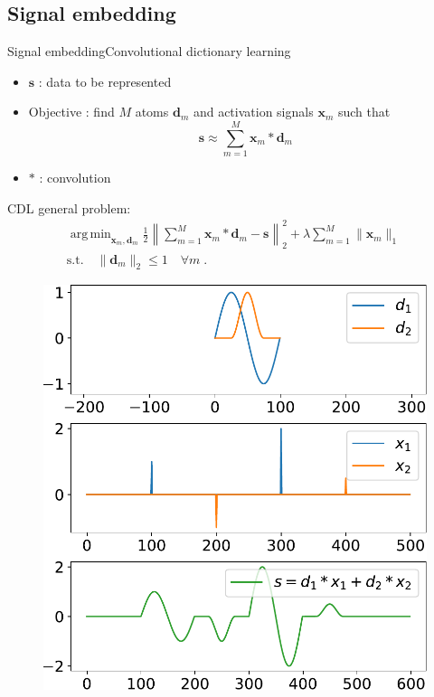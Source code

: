 \documentclass[8pt,t,aspectratio=1610]{beamer}
\newcommand{\bfx}{\mathbf{x}}
\newcommand{\bfs}{\mathbf{s}}
\newcommand{\bfd}{\mathbf{d}}
\DeclareMathOperator*{\argmin}{arg\,min}
\begin{document}
\subsection{Signal embedding}



\begin{frame}{Signal embedding}{Convolutional dictionary learning}
\begin{minipage}[t]{0.45\linewidth}
    \begin{itemize}
        \item $\bfs$ : data to be represented
        \item Objective : find $M$ atoms $\bfd_m$ and activation signals $\bfx_m$ such that
        $$\bfs \approx \sum_{m=1}^{M}\bfx_m * \bfd_m$$
        \item $*$ : convolution
    \end{itemize}
    \pause[3]
    CDL general problem:
    \begin{gather*}\label{eq:cdl_baseform}
    \argmin_{\bfx_m,\bfd_m} \frac{1}{2} \left\| \sum_{m=1}^{M} \bfx_{m} * \bfd_m - \bfs \right\|_2^2 + \lambda \sum_{m=1}^{M} \|\bfx_m \|_1 \ \\
        \text{s.t.}\quad \| \bfd_m\|_2 \leq 1 \quad \forall m \;. \nonumber
    \end{gather*}
\end{minipage}\hfill
\begin{minipage}[t]{0.4\linewidth}
    \centering
    \pause[2]
    \begin{figure}[h]
        \centering
        \includegraphics[width=0.9\linewidth]{cdl_example_2.pdf}\\

\end{figure}
\end{minipage}
\end{frame}
\end{document}
